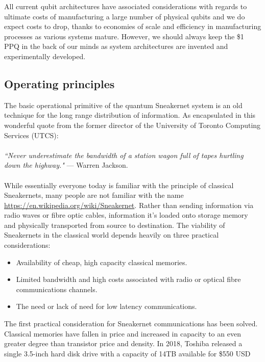 \documentclass[twocolumn, aps, rmp, amsmath, amssymb, nofootinbib, superscriptaddress, longbibliography, floatfix, table-of-contents, eqsecnum]{revtex4-2}
\newcommand{\famousquote}[2]{\noindent\textit{``#1"} --- #2.\index{Quotes}\index{#2}}
\begin{document}
All current qubit architectures have associated considerations with regards to ultimate costs of manufacturing a large number of physical qubits and we do expect costs to drop, thanks to economies of scale and efficiency in manufacturing processes as various systems mature. However, we should always keep the \$1 PPQ in the back of our minds as system architectures are invented and experimentally developed. 

\subsection{Operating principles}

The basic operational primitive of the quantum Sneakernet system is an old technique for the long range distribution of information. As encapsulated in this wonderful quote from the former director of the University of Toronto Computing Services (UTCS):
\\
\\
\famousquote{Never underestimate the bandwidth of a station wagon full of tapes hurtling down the highway.}{Warren Jackson}
\\
\\
While essentially everyone today is familiar with the principle of classical Sneakernets, many people are not familiar with the name \href{https://en.wikipedia.org/wiki/Sneakernet}{https://en.wikipedia.org/wiki/Sneakernet}. Rather than sending information via radio waves or fibre optic cables, information it's loaded onto storage memory and physically transported from source to destination. The viability of Sneakernets in the classical world depends heavily on three practical considerations:
\begin{itemize}
\item Availability of cheap, high capacity classical memories.
\item Limited bandwidth and high costs associated with radio or optical fibre communications channels.
\item The need or lack of need for low latency communications.
\end{itemize}

The first practical consideration for Sneakernet communications has been solved. Classical memories have fallen in price and increased in capacity to an even greater degree than transistor price and density. In 2018, Toshiba released a single 3.5-inch hard disk drive with a capacity of 14TB available for \$550 USD %
\end{document}
